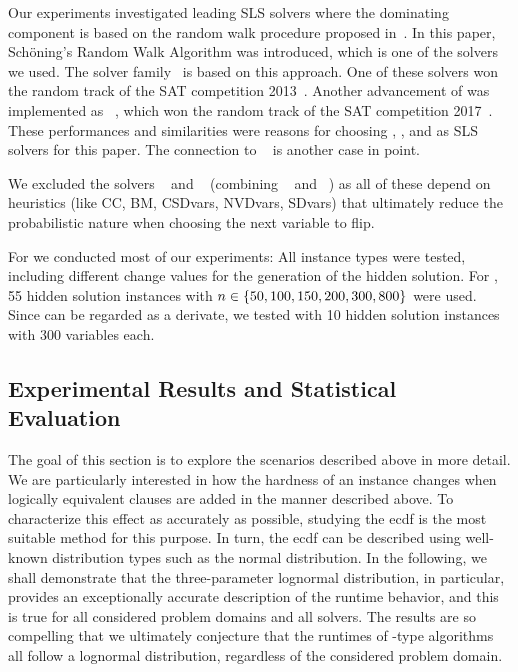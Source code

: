 Our experiments investigated leading SLS solvers where the dominating component is based on the random walk procedure proposed in~\cite{Schoening02AProbabilisticAlgorithm}.
In this paper, Schöning's Random Walk Algorithm \SRWA{} was introduced, which is one of the solvers we used.
The \probSAT{} solver family~\cite{BalintImplementationOfProbSAT} is based on this approach.
One of these solvers won the random track of the SAT competition 2013~\cite{SAT13}.
Another advancement of  was implemented as \YalSAT{}~\cite{YalSAT}, which won the random track of the SAT competition 2017~\cite{SAT17}.
These performances and similarities were reasons for choosing \SRWA{}, \probSAT{}, and \YalSAT{} as SLS solvers for this paper. The connection to \GapSAT{}~\cite{LW20OnTheEffectOfLearnedClauses} is another case in point.

We excluded the solvers ~\cite{LCS16DCCAlm} and ~\cite{LCWS16CSCCSat} (combining ~\cite{LCWS13FRW} and ~\cite{LCWS14DoubleConfiguration}) as all of these 
depend on 
heuristics (like \textsf{CC}, \textsf{BM}, \textsf{CSDvars}, \textsf{NVDvars}, \textsf{SDvars}) that ultimately reduce the probabilistic nature when choosing the next variable to flip.

For \SRWA{} we conducted most of our experiments: All instance types were tested, including different change values for the generation of the hidden solution.
For \probSAT{}, 55 hidden solution instances with $n \in \{ 50,100,150,200,300,800 \}$ were used.
Since \YAL{} can be regarded as a \probSAT{} derivate, 
we tested \YAL{} with 10 hidden solution instances with 300 variables each. 
















\subsection{Experimental Results and Statistical Evaluation}

The goal of this section is to explore the scenarios described above in more detail. We are particularly interested in how the hardness of an instance changes when logically equivalent clauses are added in the manner described above. To characterize this effect as accurately as possible, studying the ecdf is the most suitable method for this purpose. In turn, the ecdf can be described using well-known distribution types such as \eg the normal distribution. In the following, we shall demonstrate that the three-parameter lognormal distribution, in particular, provides an exceptionally accurate description of the runtime behavior, and this is true for all considered problem domains and all solvers. The results are so compelling that we ultimately conjecture that the runtimes of \Alfa{}-type algorithms all follow a lognormal distribution, regardless of the considered problem domain. 

